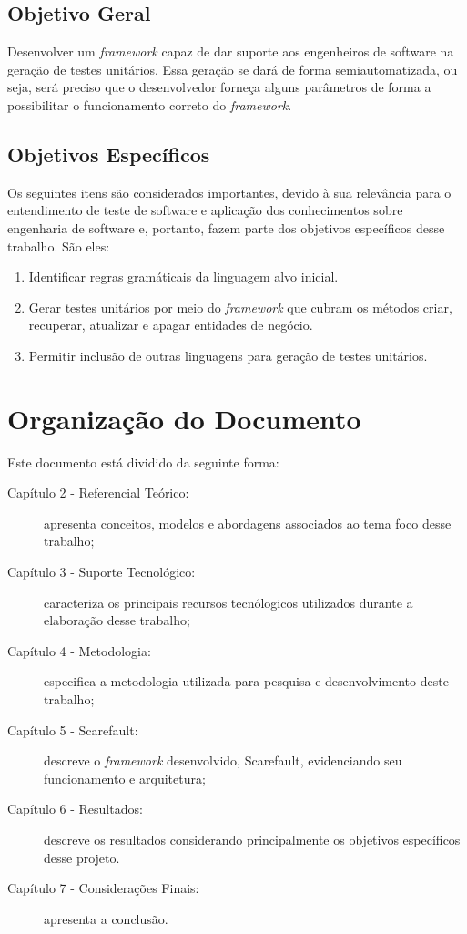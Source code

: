 \subsection{Objetivo Geral}
Desenvolver um \textit{framework} capaz de dar suporte aos engenheiros de
software na geração de testes unitários.  Essa geração se dará de forma
semiautomatizada, ou seja, será preciso que o desenvolvedor forneça alguns
parâmetros de forma a possibilitar o funcionamento correto do
\textit{framework}.

\subsection{Objetivos Específicos}
Os seguintes itens são considerados importantes, devido à sua relevância para o
entendimento de teste de software e aplicação dos conhecimentos sobre
engenharia de software e, portanto, fazem parte dos objetivos específicos desse
trabalho. São eles:
\begin{enumerate}

  \item Identificar regras gramáticais da linguagem alvo inicial.

  \item Gerar testes unitários por meio do \textit{framework} que cubram
    os métodos criar, recuperar, atualizar e apagar entidades de negócio.
    
  \item Permitir inclusão de outras linguagens para geração de testes unitários.

\end{enumerate}

\section{Organização do Documento}
  Este documento está dividido da seguinte forma:

\begin{description}
  \item[Capítulo 2 - Referencial Teórico:] apresenta conceitos, modelos e
    abordagens associados ao tema foco desse trabalho;

  \item[Capítulo 3 - Suporte Tecnológico:] caracteriza os principais recursos
    tecnólogicos utilizados durante a elaboração desse trabalho;

  \item[Capítulo 4 - Metodologia:] especifica a metodologia utilizada para
    pesquisa e desenvolvimento deste trabalho;

  \item[Capítulo 5 - Scarefault:] descreve o \textit{framework} desenvolvido, Scarefault, evidenciando seu funcionamento e arquitetura;

  \item[Capítulo 6 - Resultados:] descreve os resultados considerando principalmente os objetivos específicos desse projeto.
  
  \item[Capítulo 7 - Considerações Finais:] apresenta a conclusão.
\end{description}
